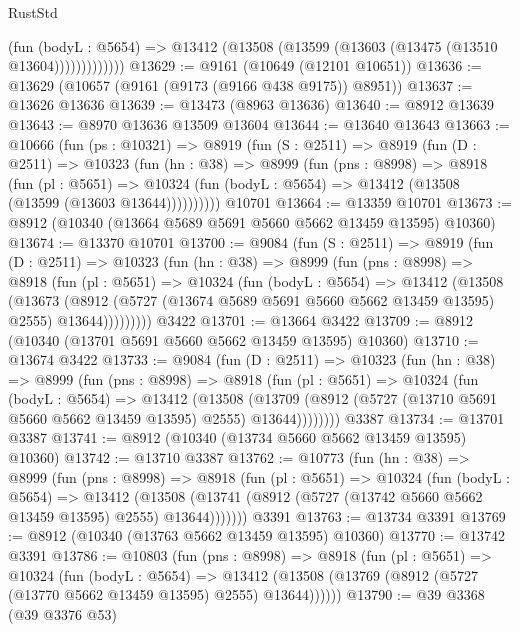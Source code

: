 \begin{lexlean}{RustStd}
\begin{coremodule}
                  (fun (bodyL : @5654) =>
                  @13412 (@13508 (@13599 (@13603 (@13475 (@13510 @13604)))))))))))))
@13629 := @9161 (@10649 (@12101 @10651))
@13636 := @13629 (@10657 (@9161 (@9173 (@9166 @438 @9175)) @8951))
@13637 := @13626 @13636
@13639 := @13473 (@8963 @13636)
@13640 := @8912 @13639
@13643 := @8970 @13636 @13509 @13604
@13644 := @13640 @13643
@13663 := @10666
    (fun (ps : @10321) =>
    @8919
      (fun (S : @2511) =>
      @8919
        (fun (D : @2511) =>
        @10323
          (fun (hn : @38) =>
          @8999
            (fun (pns : @8998) =>
            @8918
              (fun (pl : @5651) =>
              @10324 (fun (bodyL : @5654) => @13412 (@13508 (@13599 (@13603 @13644))))))))))
    @10701
@13664 := @13359 @10701
@13673 := @8912 (@10340 (@13664 @5689 @5691 @5660 @5662 @13459 @13595) @10360)
@13674 := @13370 @10701
@13700 := @9084
    (fun (S : @2511) =>
    @8919
      (fun (D : @2511) =>
      @10323
        (fun (hn : @38) =>
        @8999
          (fun (pns : @8998) =>
          @8918
            (fun (pl : @5651) =>
            @10324
              (fun (bodyL : @5654) =>
              @13412
                (@13508
                  (@13673
                    (@8912
                      (@5727 (@13674 @5689 @5691 @5660 @5662 @13459 @13595) @2555)
                      @13644)))))))))
    @3422
@13701 := @13664 @3422
@13709 := @8912 (@10340 (@13701 @5691 @5660 @5662 @13459 @13595) @10360)
@13710 := @13674 @3422
@13733 := @9084
    (fun (D : @2511) =>
    @10323
      (fun (hn : @38) =>
      @8999
        (fun (pns : @8998) =>
        @8918
          (fun (pl : @5651) =>
          @10324
            (fun (bodyL : @5654) =>
            @13412
              (@13508
                (@13709 (@8912 (@5727 (@13710 @5691 @5660 @5662 @13459 @13595) @2555) @13644))))))))
    @3387
@13734 := @13701 @3387
@13741 := @8912 (@10340 (@13734 @5660 @5662 @13459 @13595) @10360)
@13742 := @13710 @3387
@13762 := @10773
    (fun (hn : @38) =>
    @8999
      (fun (pns : @8998) =>
      @8918
        (fun (pl : @5651) =>
        @10324
          (fun (bodyL : @5654) =>
          @13412
            (@13508 (@13741 (@8912 (@5727 (@13742 @5660 @5662 @13459 @13595) @2555) @13644)))))))
    @3391
@13763 := @13734 @3391
@13769 := @8912 (@10340 (@13763 @5662 @13459 @13595) @10360)
@13770 := @13742 @3391
@13786 := @10803
    (fun (pns : @8998) =>
    @8918
      (fun (pl : @5651) =>
      @10324
        (fun (bodyL : @5654) =>
        @13412 (@13508 (@13769 (@8912 (@5727 (@13770 @5662 @13459 @13595) @2555) @13644))))))
@13790 := @39 @3368 (@39 @3376 @53)

\end{coremodule}
\end{lexlean}
